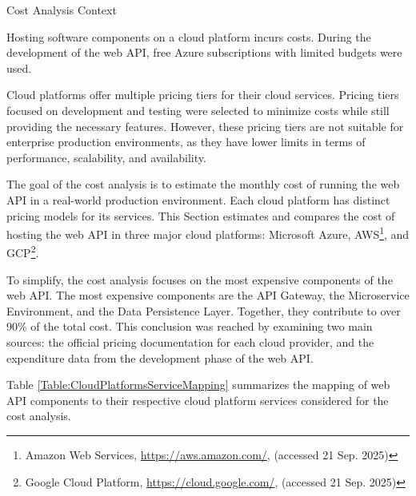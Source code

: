 \documentclass[12pt, reqno, oneside]{amsbook}
\makeatletter
\def\subsection{\@startsection{subsection}{2}%
      \z@{.5\linespacing\@plus.7\linespacing}{.25\linespacing}%
      {\normalfont\bfseries\flushleft}}
\theoremstyle{definition}
\theoremstyle{definition}
\numberwithin{section}{chapter}
\numberwithin{table}{chapter}
\numberwithin{figure}{chapter}
\makeatother
\begin{document}
\subsection{Cost Analysis Context}
\label{Subsection:Cost_Analysis_Context}

Hosting software components on a cloud platform incurs costs. During the development of the web \ac{API}, free Azure subscriptions with limited budgets were used.

Cloud platforms offer multiple pricing tiers for their cloud services. Pricing tiers focused on development and testing were selected to minimize costs while still providing the necessary features. However, these pricing tiers are not suitable for enterprise production environments, as they have lower limits in terms of performance, scalability, and availability.

The goal of the cost analysis is to estimate the monthly cost of running the web \ac{API} in a real-world production environment. Each cloud platform has distinct pricing models for its services. This Section estimates and compares the cost of hosting the web \ac{API} in three major cloud platforms: Microsoft Azure, \ac{AWS}\footnote{Amazon Web Services, \url{https://aws.amazon.com/}, (accessed 21 Sep. 2025)}, and \ac{GCP}\footnote{Google Cloud Platform, \url{https://cloud.google.com/}, (accessed 21 Sep. 2025)}.

To simplify, the cost analysis focuses on the most expensive components of the web \ac{API}. The most expensive components are the \ac{API} Gateway, the Microservice Environment, and the Data Persistence Layer. Together, they contribute to over 90\% of the total cost. This conclusion was reached by examining two main sources: the official pricing documentation for each cloud provider, and the expenditure data from the development phase of the web \ac{API}.

Table \ref{Table:CloudPlatformsServiceMapping} summarizes the mapping of web \ac{API} components to their respective cloud platform services considered for the cost analysis.
\end{document}
